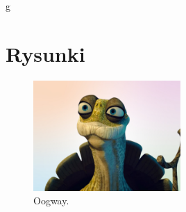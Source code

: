 g\documentclass{article}
\begin{document}
\section{Rysunki}
\begin{figure}[h]
    \centering
    \includegraphics[width=0.5\textwidth]{rysunek1.png}
    \caption{Oogway.}
    \label{fig:rysunek1.png}
\end{figure}
\end{document}

